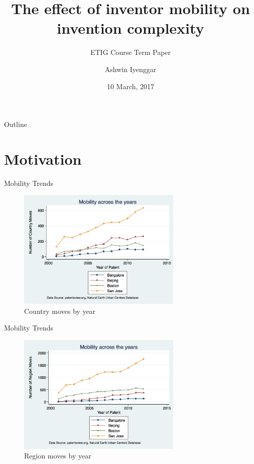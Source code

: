 \documentclass{beamer}
\title{The effect of inventor mobility on  invention complexity}
\subtitle{ETIG Course Term Paper}
\author{Ashwin Iyenggar}
\institute[Indian Institute of Management Bangalore] 
{
  Corporate Strategy and Policy\\
  Indian Institute of Management Bangalore
}
\date{10 March, 2017}
\begin{document}
\begin{frame}
  \titlepage
\end{frame}

\begin{frame}{Outline}
  \tableofcontents
\end{frame}
\section{Motivation}

\begin{frame}{Mobility Trends}
\begin{figure}[h]
\begin{centering}
  \includegraphics[width=0.7\textwidth]{countrymoves}
  \caption{Country moves by year}
   \label{fig:countrymoves}
\end{centering}
\end{figure}
\end{frame}

\begin{frame}{Mobility Trends}
\begin{figure}[h]
\begin{centering}
  \includegraphics[width=0.7\textwidth]{regionmoves}
  \caption{Region moves by year}
   \label{fig:regionmoves}
\end{centering}
\end{figure}
\end{frame}
\end{document}

